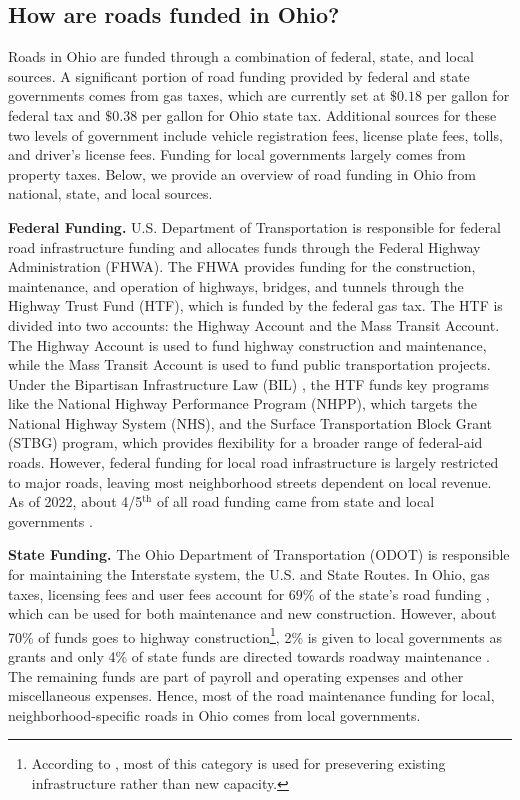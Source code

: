 \subsection{How are roads funded in Ohio?}

Roads in Ohio are funded through a combination of federal, state, and local sources. A significant portion of road funding provided by federal and state governments comes from gas taxes, which are currently set at $\$0.18$ per gallon for federal tax and $\$0.38$ per gallon for Ohio state tax. Additional sources for these two levels of government include vehicle registration fees, license plate fees, tolls, and driver's license fees. Funding for local governments largely comes from property taxes. Below, we provide an overview of road funding in Ohio from national, state, and local sources.

{\bf Federal Funding.} U.S. Department of Transportation is responsible for federal road infrastructure funding and allocates funds through the Federal Highway Administration (FHWA). The FHWA provides funding for the construction, maintenance, and operation of highways, bridges, and tunnels through the Highway Trust Fund (HTF), which is funded by the federal gas tax. The HTF is divided into two accounts: the Highway Account and the Mass Transit Account. The Highway Account is used to fund highway construction and maintenance, while the Mass Transit Account is used to fund public transportation projects. Under the Bipartisan Infrastructure Law (BIL) \citep{USDOT_BIL_Ohio}, the HTF funds key programs like the National Highway Performance Program (NHPP), which targets the National Highway System (NHS), and the Surface Transportation Block Grant (STBG) program, which provides flexibility for a broader range of federal-aid roads. However, federal funding for local road infrastructure is largely restricted to major roads, leaving most neighborhood streets dependent on local revenue. As of 2022, about 4/5$^\text{th}$ of all road funding came from state and local governments \citep{pgpf_htf_explained}.

{\bf State Funding.} The Ohio Department of Transportation (ODOT) is responsible for maintaining the Interstate system, the U.S. and State Routes. In Ohio, gas taxes, licensing fees and user fees account for $69\%$ of the state's road funding \citep{boesen2021}, which can be used for both maintenance and new construction. However, about 70\% of funds goes to highway construction\footnote{According to \citep{odot2023}, most of this category is used for presevering existing infrastructure rather than new capacity.}, 2\% is given to local governments as grants and only 4\% of state funds are directed towards roadway maintenance \citep{odot2023}. The remaining funds are part of payroll and operating expenses and other miscellaneous expenses. Hence, most of the road maintenance funding for local, neighborhood-specific roads in Ohio comes from local governments. 

